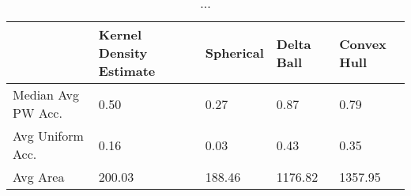 \begin{table}[ht!]
\centering
\caption{...} 
\label{tab:median_prop_captured_and_size_summary}
\begin{tabular}{R{1.6in}L{1.1in}L{.95in}L{.95in}L{.95in}}
  \hline
\hline
  & Kernel Density Estimate & Spherical & Delta Ball & Convex Hull \\ 
  \hline
Median Avg PW Acc. & 0.50 & 0.27 & 0.87 & 0.79 \\ 
  Avg Uniform Acc. & 0.16 & 0.03 & 0.43 & 0.35 \\ 
  Avg Area &  200.03 &  188.46 & 1176.82 & 1357.95 \\ 
   \hline
\end{tabular}
\end{table}
